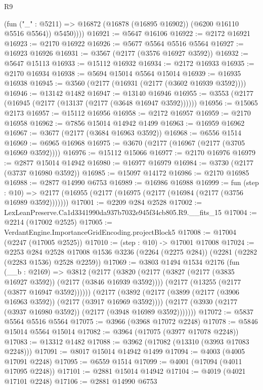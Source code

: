 \begin{lexlean}{R9}
\begin{coremodule}
            (fun ("_" : @5211) => @16872 (@16878 (@16895 @16902)) (@6200 @16110 @5516 @5564))
            @5450))))
@16921 := @5647 @16106
@16922 := @2172 @16921
@16923 := @2170 @16922
@16926 := @5677 @5564 @5516 @5564
@16927 := @16923 @16926
@16931 := @3567 (@2177 (@3576 @16927 @3592))
@16932 := @5647 @15113
@16933 := @15112 @16932
@16934 := @2172 @16933
@16935 := @2170 @16934
@16938 := @5694 @15014 @5564 @15014
@16939 := @16935 @16938
@16945 := @3560 (@2177 (@16931 (@2177 (@3602 @16939 @3592))))
@16946 := @13142 @1482
@16947 := @13140 @16946
@16955 := @3553 (@2177 (@16945 (@2177 (@13137 (@2177 (@3648 @16947 @3592))))))
@16956 := @15065 @2173
@16957 := @15112 @16956
@16958 := @2172 @16957
@16959 := @2170 @16958
@16962 := @7856 @15014 @14942 @1499
@16963 := @16959 @16962
@16967 := @3677 (@2177 (@3684 @16963 @3592))
@16968 := @6556 @1514
@16969 := @6965 @16968
@16975 := @3670 (@2177 (@16967 (@2177 (@3705 @16969 @3592))))
@16976 := @15112 @15066
@16977 := @2170 @16976
@16979 := @2877 @15014 @14942
@16980 := @16977 @16979
@16984 := @3730 (@2177 (@3737 @16980 @3592))
@16985 := @15097 @14172
@16986 := @2170 @16985
@16988 := @2877 @14990 @6753
@16989 := @16986 @16988
@16999 := fun (step : @10) =>
  @2177 (@16955 (@2177 (@16975 (@2177 (@16984 (@2177 (@3756 @16989 @3592)))))))
@17001 := @2209 @284 @2528
@17002 := LexLeanPreserve.Ca1d3341990da937b7032e945f34cb805.R9.__fits_15
@17004 := @2214 (@17002 @2525)
@17005 := VerdantEngine.ImportanceGridEncoding.projectBlock5
@17008 := @17004 (@2247 (@17005 @2525))
@17010 := (step : @10) -> @17001 @17008
@17024 := @2253
    @284
    @2528
    @17008
    @1536
    @3236
    (@2264 (@2275 @284))
    (@2281 (@2282 (@2283 @1536) @2528 @2259))
@17069 := @3803
    @1494
    @1534
    @2176
    (fun (__b : @2169) =>
    @3812
      (@2177
        (@3820
          (@2177 (@3827 (@2177 (@3835 @16927 @3592)) (@2177 (@3846 @16939 @3592))))
          (@2177 (@13255 (@2177 (@3877 @16947 @3592))))))
      (@2177
        (@3892
          (@2177 (@3899 (@2177 (@3906 @16963 @3592)) (@2177 (@3917 @16969 @3592))))
          (@2177 (@3930 (@2177 (@3937 @16980 @3592)) (@2177 (@3948 @16989 @3592)))))))
@17072 := @5837 @5564 @5516 @5564
@17075 := @3966 (@3968 @17072 @2248)
@17078 := @5846 @15014 @5564 @15014
@17082 := @3964 (@17075 (@3977 @17078 @2248))
@17083 := @13312 @1482
@17088 := @3962 (@17082 (@13310 (@3993 @17083 @2248)))
@17091 := @8017 @15014 @14942 @1499
@17094 := @4003 (@4005 @17091 @2248)
@17095 := @6559 @1514
@17099 := @4001 (@17094 (@4011 @17095 @2248))
@17101 := @2881 @15014 @14942
@17104 := @4019 (@4021 @17101 @2248)
@17106 := @2881 @14990 @6753

\end{coremodule}
\end{lexlean}
